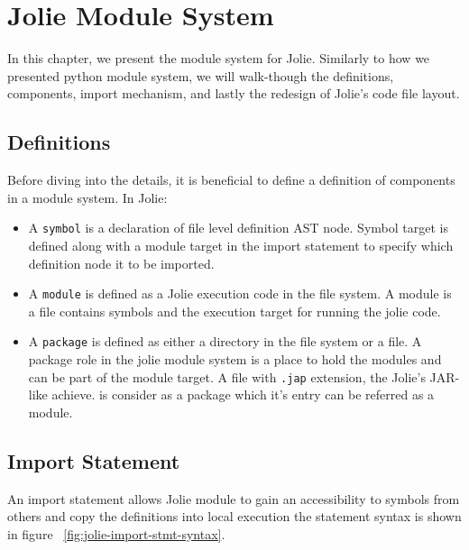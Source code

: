 \chapter{Jolie Module System}

In this chapter, we present the module system for Jolie.
Similarly to how we presented python module system, we will walk-though the definitions, components, import mechanism, and lastly the redesign of Jolie's code file layout.

\section{Definitions}

Before diving into the details, it is beneficial to define a definition of components in a module system. In Jolie:

\begin{itemize}
    \item
          A \texttt{symbol} is a declaration of file level definition AST node. Symbol target is defined along with a module target in the import statement to specify which definition node it to be imported.
    \item
          A \texttt{module} is defined as a Jolie execution code in the file system. A module is a file contains symbols and the execution target for running the jolie code.
    \item
          A \texttt{package} is defined as either a directory in the file system or a file. A package role in the jolie module system is a place to hold the modules and can be part of the module target. A file with \texttt{.jap} extension, the Jolie's JAR-like achieve. is consider as a package which it's entry can be referred as a module.
\end{itemize}

\section{Import Statement}
An import statement allows Jolie module to gain an accessibility to symbols from others and copy the definitions into local execution the statement syntax is shown in figure ~\ref{fig:jolie-import-stmt-syntax}.

